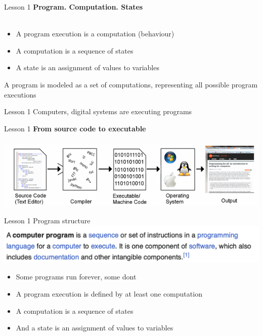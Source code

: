 \documentclass[aspectratio=1610]{beamer}
\begin{document}
\begin{frame}{Lesson 1}{}
\Large
\textbf{Program. Computation. States}\\~\\

\Large{
\begin{itemize}
    \item A program execution is a computation (behaviour)
    \item A computation is a sequence of states    
    \item A state is an assignment of values to variables
\end{itemize}}

\Large {A program is modeled as a set of computations, representing all possible program executions}
\end{frame}








\begin{frame}{Lesson 1}{}
\Huge Computers, digital systems are executing programs
\end{frame}


\begin{frame}{Lesson 1}{}
\Large
\textbf{From source code to executable}\\~\\ 
\includegraphics[scale=0.65]{Images/CompilationChain}
\end{frame}


\begin{frame}{Lesson 1}{}
{\Huge{Program structure}}
\includegraphics[scale=0.67]{Images/program}

\Large{
\begin{itemize}
    \item Some programs run forever, some dont
    \item A program execution is defined by at least one computation
    \item A computation is a sequence of states
    \item And a state is an assignment of values to variables
\end{itemize}}

\end{frame}
\end{document}
